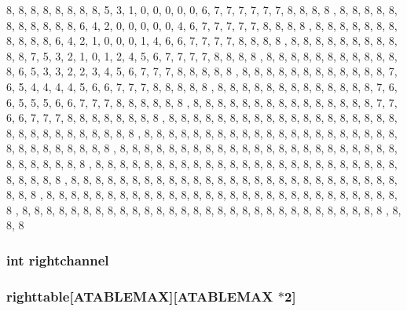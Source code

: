 \begin{DoxyCode}
 {
{ 8, 8, 8, 8, 8, 8, 8, 8, 5, 3, 1, 0, 0, 0, 0, 0, 6, 7, 7, 7, 7, 7, 7, 8, 8, 8, 8
      , 8, 8, 8},
{ 8, 8, 8, 8, 8, 8, 8, 8, 6, 4, 2, 0, 0, 0, 0, 0, 4, 6, 7, 7, 7, 7, 7, 8, 8, 8, 8
      , 8, 8, 8},
{ 8, 8, 8, 8, 8, 8, 8, 8, 6, 4, 2, 1, 0, 0, 0, 1, 4, 6, 6, 7, 7, 7, 7, 8, 8, 8, 8
      , 8, 8, 8},
{ 8, 8, 8, 8, 8, 8, 8, 8, 7, 5, 3, 2, 1, 0, 1, 2, 4, 5, 6, 7, 7, 7, 7, 8, 8, 8, 8
      , 8, 8, 8},
{ 8, 8, 8, 8, 8, 8, 8, 8, 8, 6, 5, 3, 3, 2, 2, 3, 4, 5, 6, 7, 7, 7, 8, 8, 8, 8, 8
      , 8, 8, 8},
{ 8, 8, 8, 8, 8, 8, 8, 8, 8, 7, 6, 5, 4, 4, 4, 4, 5, 6, 6, 7, 7, 7, 8, 8, 8, 8, 8
      , 8, 8, 8},
{ 8, 8, 8, 8, 8, 8, 8, 8, 8, 8, 7, 6, 6, 5, 5, 5, 6, 6, 7, 7, 7, 8, 8, 8, 8, 8, 8
      , 8, 8, 8},
{ 8, 8, 8, 8, 8, 8, 8, 8, 8, 8, 8, 8, 7, 7, 6, 6, 7, 7, 7, 8, 8, 8, 8, 8, 8, 8, 8
      , 8, 8, 8},
{ 8, 8, 8, 8, 8, 8, 8, 8, 8, 8, 8, 8, 8, 8, 8, 8, 8, 8, 8, 8, 8, 8, 8, 8, 8, 8, 8
      , 8, 8, 8},
{ 8, 8, 8, 8, 8, 8, 8, 8, 8, 8, 8, 8, 8, 8, 8, 8, 8, 8, 8, 8, 8, 8, 8, 8, 8, 8, 8
      , 8, 8, 8},
{ 8, 8, 8, 8, 8, 8, 8, 8, 8, 8, 8, 8, 8, 8, 8, 8, 8, 8, 8, 8, 8, 8, 8, 8, 8, 8, 8
      , 8, 8, 8},
{ 8, 8, 8, 8, 8, 8, 8, 8, 8, 8, 8, 8, 8, 8, 8, 8, 8, 8, 8, 8, 8, 8, 8, 8, 8, 8, 8
      , 8, 8, 8},
{ 8, 8, 8, 8, 8, 8, 8, 8, 8, 8, 8, 8, 8, 8, 8, 8, 8, 8, 8, 8, 8, 8, 8, 8, 8, 8, 8
      , 8, 8, 8},
{ 8, 8, 8, 8, 8, 8, 8, 8, 8, 8, 8, 8, 8, 8, 8, 8, 8, 8, 8, 8, 8, 8, 8, 8, 8, 8, 8
      , 8, 8, 8},
{ 8, 8, 8, 8, 8, 8, 8, 8, 8, 8, 8, 8, 8, 8, 8, 8, 8, 8, 8, 8, 8, 8, 8, 8, 8, 8, 8
      , 8, 8, 8}
}
\end{DoxyCode}
\hypertarget{WL__GAME_8C_acaafea4509823e29f2db52d7572f650c}{
\subsubsection[{rightchannel}]{\setlength{\rightskip}{0pt plus 5cm}int {\bf rightchannel}}}
\label{WL__GAME_8C_acaafea4509823e29f2db52d7572f650c}
\hypertarget{WL__GAME_8C_af8f5331c080873bf88230ea5dea0075f}{
\subsubsection[{righttable}]{ {\bf righttable}\mbox{[}ATABLEMAX\mbox{]}\mbox{[}ATABLEMAX $\ast$2\mbox{]}}}
\label{WL__GAME_8C_af8f5331c080873bf88230ea5dea0075f}
